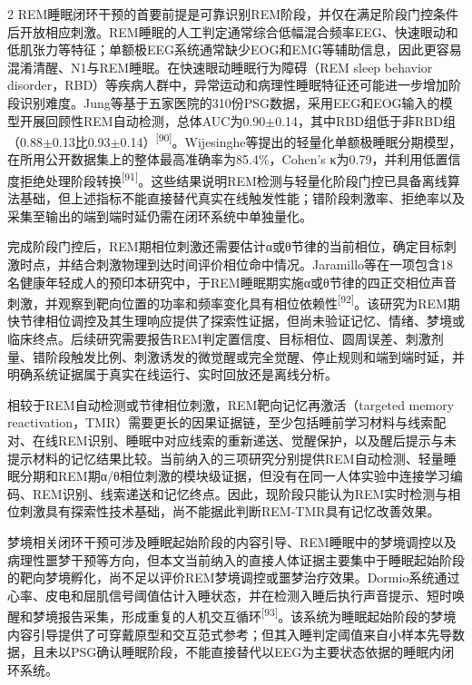 \documentclass[UTF8,zihao=5,fontset=none]{ctexart}
\newcommand{\hei}{\CJKfamily{hei}}
\newcommand{\leveltwo}[1]{%
  \par\noindent{\hei\fontsize{10pt}{12pt}\selectfont\bfseries #1\par}}
\newcommand{\refcite}[1]{\nolinebreak[4]\textsuperscript{[#1]}}
\begin{document}
\begin{multicols}{2}
REM睡眠闭环干预的首要前提是可靠识别REM阶段，并仅在满足阶段门控条件后开放相应刺激。REM睡眠的人工判定通常综合低幅混合频率EEG、快速眼动和低肌张力等特征；单额极EEG系统通常缺少EOG和EMG等辅助信息，因此更容易混淆清醒、N1与REM睡眠。在快速眼动睡眠行为障碍（REM sleep behavior disorder，RBD）等疾病人群中，异常运动和病理性睡眠特征还可能进一步增加阶段识别难度。Jung等基于五家医院的310份PSG数据，采用EEG和EOG输入的模型开展回顾性REM自动检测，总体AUC为0.90$\pm$0.14，其中RBD组低于非RBD组（0.88$\pm$0.13比0.93$\pm$0.14）\refcite{90}。Wijesinghe等提出的轻量化单额极睡眠分期模型，在所用公开数据集上的整体最高准确率为85.4\%，Cohen's κ为0.79，并利用低置信度拒绝处理阶段转换\refcite{91}。这些结果说明REM检测与轻量化阶段门控已具备离线算法基础，但上述指标不能直接替代真实在线触发性能；错阶段刺激率、拒绝率以及采集至输出的端到端时延仍需在闭环系统中单独量化。\par

完成阶段门控后，REM期相位刺激还需要估计α或θ节律的当前相位，确定目标刺激时点，并结合刺激物理到达时间评价相位命中情况。Jaramillo等在一项包含18名健康年轻成人的预印本研究中，于REM睡眠期实施α或θ节律的四正交相位声音刺激，并观察到靶向位置的功率和频率变化具有相位依赖性\refcite{92}。该研究为REM期快节律相位调控及其生理响应提供了探索性证据，但尚未验证记忆、情绪、梦境或临床终点。后续研究需要报告REM判定置信度、目标相位、圆周误差、刺激剂量、错阶段触发比例、刺激诱发的微觉醒或完全觉醒、停止规则和端到端时延，并明确系统证据属于真实在线运行、实时回放还是离线分析。\par

相较于REM自动检测或节律相位刺激，REM靶向记忆再激活（targeted memory reactivation，TMR）需要更长的因果证据链，至少包括睡前学习材料与线索配对、在线REM识别、睡眠中对应线索的重新递送、觉醒保护，以及醒后提示与未提示材料的记忆结果比较。当前纳入的三项研究分别提供REM自动检测、轻量睡眠分期和REM期α/θ相位刺激的模块级证据，但没有在同一人体实验中连接学习编码、REM识别、线索递送和记忆终点。因此，现阶段只能认为REM实时检测与相位刺激具有探索性技术基础，尚不能据此判断REM-TMR具有记忆改善效果。\par

\leveltwo{4.4 梦境调控}

梦境相关闭环干预可涉及睡眠起始阶段的内容引导、REM睡眠中的梦境调控以及病理性噩梦干预等方向，但本文当前纳入的直接人体证据主要集中于睡眠起始阶段的靶向梦境孵化，尚不足以评价REM梦境调控或噩梦治疗效果。Dormio系统通过心率、皮电和屈肌信号阈值估计入睡状态，并在检测入睡后执行声音提示、短时唤醒和梦境报告采集，形成重复的人机交互循环\refcite{93}。该系统为睡眠起始阶段的梦境内容引导提供了可穿戴原型和交互范式参考；但其入睡判定阈值来自小样本先导数据，且未以PSG确认睡眠阶段，不能直接替代以EEG为主要状态依据的睡眠内闭环系统。\par


\end{multicols}
\end{document}
